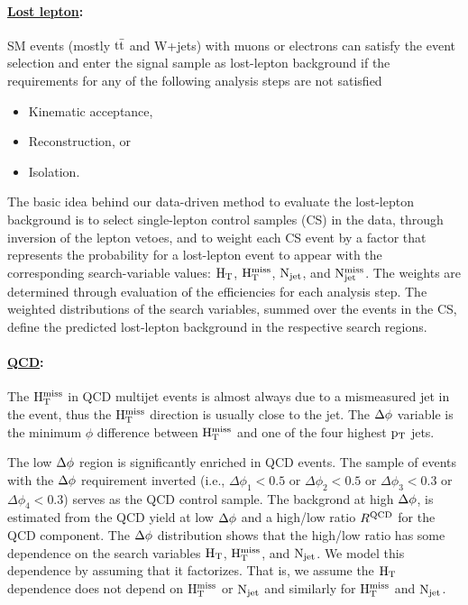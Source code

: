 \paragraph{\underline{Lost lepton}: }
SM events (mostly $\rm t\bar{t}$ and W+jets) with muons or electrons
can satisfy the event selection and enter the signal sample as lost-lepton background
if the requirements for any of the following analysis steps are not satisfied

\begin{itemize}
\item Kinematic acceptance,
\item Reconstruction, or
\item Isolation.
\end{itemize}
The basic idea behind our data-driven method to evaluate
the lost-lepton background is to select
single-lepton control samples (CS) in the data,
through inversion of the lepton vetoes,
and to weight each CS event
by a factor that represents the probability for a lost-lepton event
to appear with
the corresponding search-variable values: $\rm H_{T}$, $\rm H_{T}^{miss}$, $\rm N_{jet}$, and $\rm N_{jet}^{miss}$.
The weights are determined through evaluation of the efficiencies
for each analysis step.
The weighted distributions of the search variables,
summed over the events in the CS,
define the predicted lost-lepton background in the respective search regions.
\paragraph{\underline{QCD}: }
The $\rm H_{T}^{miss}$ in QCD multijet events is almost always due to a mismeasured jet in the event,
       thus the $\rm H_{T}^{miss}$ direction is usually close to the jet.
       The $\rm \Delta \phi$ variable is the minimum $\phi$ difference between $\rm H_{T}^{miss}$ and one of the four
       highest $\rm p_{T}$ jets.


       The low $\rm \Delta \phi$ region is significantly enriched in QCD events.
       The sample of events with the $\rm \Delta \phi$ requirement inverted
       (i.e., $\Delta \phi_1<0.5$ or $\Delta \phi_2<0.5$ or $\Delta \phi_3<0.3$ or $\Delta \phi_4<0.3$)
       serves as the QCD control sample.
       The backgrond at high $\rm \Delta \phi$, is estimated from the QCD yield at low
       $\rm \Delta \phi$ and a high/low ratio $R^{\rm QCD}$ for the QCD component.
       The $\rm \Delta \phi$ distribution  shows that the high/low ratio
       has some dependence on the search variables $\rm H_{T}$, $\rm H_{T}^{miss}$, and $\rm N_{jet}$.
       We model this dependence by assuming that it factorizes.  That is, we assume the $\rm H_{T}$
       dependence does not depend on $\rm H_{T}^{miss}$ or $\rm N_{jet}$ and similarly for $\rm H_{T}^{miss}$ and $\rm N_{jet}$.
